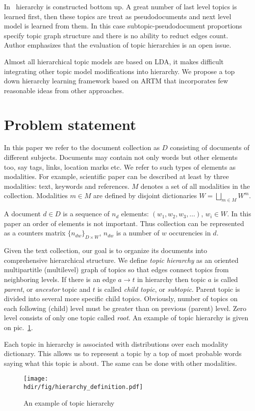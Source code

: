 \documentclass[12pt, twoside]{article}
\newcommand{\hdir}{.}
\begin{document}
In~\cite{Zavitsanos} hierarchy is constructed bottom up. A great number of last level topics is learned first, then these topics are treat as pseudodocuments and next level model is learned from them. In this case subtopic-pseudodocument proportions specify topic graph structure and there is no ability to reduct edges count. Author emphasizes that the evaluation of topic hierarchies is an open issue.

Almost all hierarchical topic models are based on LDA, it makes difficult integrating other topic model modifications into hierarchy. We propose 
a top down hierarchy learning framework based on ARTM that incorporates few reasonable ideas from other approaches.

\section{Problem statement}
\label{ProblemStatement}
In this paper we refer to the document collection as $D$ consisting of documents of different subjects.
Documents may contain not only words but other elements too, say tags, links, location marks etc. We refer to such types of elements as modalities. For example, scientific paper can be described at least by three modalities: text, keywords and references. $M$ denotes a set of all modalities in the collection. Modalities $m \in M$ are defined by disjoint dictionaries $W = \bigsqcup_{m \in M} W^m$. 

A document $d \in D$ is a sequence of $n_d$ elements: $(w_1, w_2, w_3, \dots)$, $w_i \in W$. In this paper an order of elements is not important. Thus collection can be represented as a counters matrix $\{n_{dw}\}_{D \times W}$, $n_{dw}$ is a number of $w$ occurencies in $d$.

Given the text collection, our goal is to organize its documents into comprehensive hierarchical structure. We define \emph{topic hierarchy} as an oriented multipartitle (multilevel) graph of topics so that edges connect topics from neighboring levels. If there is an edge $a \rightarrow t$ in hierarchy then topic $a$ is called \emph{parent}, or \emph{ancestor} topic and $t$ is called \emph{child topic}, or \emph{subtopic}. Parent topic is divided into several more specific child topics. 
Obviously, number of topics on each following (child) level must be greater than on previous (parent) level. Zero level consists of only one topic called \emph{root}. An example of topic hierarchy is given on pic.~\ref{fg:hierarchy}.

Each topic in hierarchy is associated with distributions over each modality dictionary. This allows us to represent a topic by a top of most probable words saying what this topic is about. The same can be done with other modalities.
\begin{figure}[!th]
	\begin{center}
		\texttt{[image: \\hdir/fig/hierarchy\_definition.pdf]}
	\end{center}
	\caption{An example of topic hierarchy}
	\label{fg:hierarchy}
\end{figure}
\end{document}
